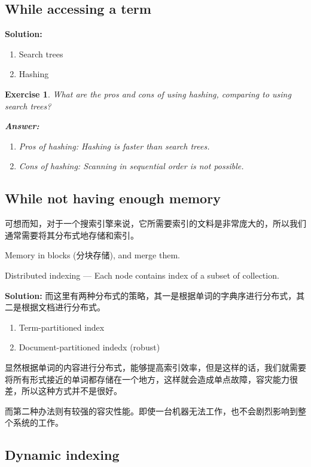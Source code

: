 \documentclass{article}
\newtheorem*{Exercise}{Exercise}
\begin{document}
\subsection{While accessing a term}
\textbf{Solution:}
\begin{enumerate}
    \item Search trees
    \item Hashing
\end{enumerate}

\begin{Exercise}
    What are the pros and cons of using hashing, comparing to using search trees?\par
    \textbf{Answer:}
    \begin{enumerate}
        \item Pros of hashing: Hashing is faster than search trees.
        \item Cons of hashing: Scanning in sequential order is not possible.
    \end{enumerate}
\end{Exercise}

\subsection{While not having enough memory}
可想而知，对于一个搜索引擎来说，它所需要索引的文料是非常庞大的，所以我们通常需要将其分布式地存储和索引。\par
Memory in blocks (分块存储), and merge them. 

Distributed indexing --- Each node contains index of a subset of collection. 

\textbf{Solution:}
而这里有两种分布式的策略，其一是根据单词的字典序进行分布式，其二是根据文档进行分布式。
\begin{enumerate}
    \item Term-partitioned index
    \item Document-partitioned indedx (robust)
\end{enumerate}

显然根据单词的内容进行分布式，能够提高索引效率，但是这样的话，我们就需要将所有形式接近的单词都存储在一个地方，这样就会造成单点故障，容灾能力很差，所以这种方式并不是很好。\par
而第二种办法则有较强的容灾性能。即使一台机器无法工作，也不会剧烈影响到整个系统的工作。\par

\subsection{Dynamic indexing}
\end{document}
